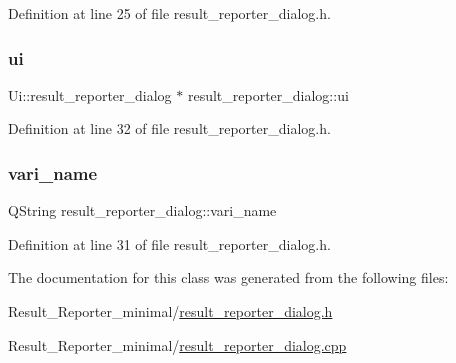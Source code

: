 Definition at line 25 of file result\+\_\+reporter\+\_\+dialog.\+h.

\mbox{\label{classresult__reporter__dialog_a39c7aed3c9e33fecef625ef148e529c1}} 
\subsubsection{\texorpdfstring{ui}{ui}}
{\footnotesize\ttfamily Ui\+::result\+\_\+reporter\+\_\+dialog $\ast$ result\+\_\+reporter\+\_\+dialog\+::ui\hspace{0.3cm}{\ttfamily [private]}}



Definition at line 32 of file result\+\_\+reporter\+\_\+dialog.\+h.

\mbox{\label{classresult__reporter__dialog_a9e9486d712fcf04bba7dc075c884ef2d}} 
\subsubsection{\texorpdfstring{vari\+\_\+name}{vari\_name}}
{\footnotesize\ttfamily Q\+String result\+\_\+reporter\+\_\+dialog\+::vari\+\_\+name\hspace{0.3cm}{\ttfamily [private]}}



Definition at line 31 of file result\+\_\+reporter\+\_\+dialog.\+h.



The documentation for this class was generated from the following files\+:\begin{DoxyCompactItemize}
\item 
Result\+\_\+\+Reporter\+\_\+minimal/\hyperlink{Result__Reporter__minimal_2result__reporter__dialog_8h}{result\+\_\+reporter\+\_\+dialog.\+h}\item 
Result\+\_\+\+Reporter\+\_\+minimal/\hyperlink{Result__Reporter__minimal_2result__reporter__dialog_8cpp}{result\+\_\+reporter\+\_\+dialog.\+cpp}\end{DoxyCompactItemize}
